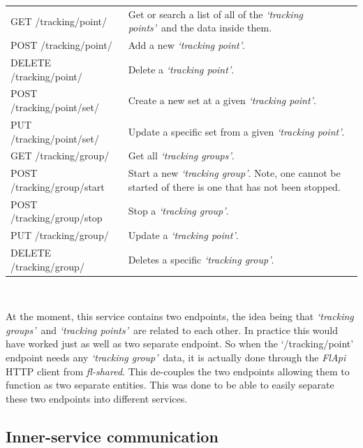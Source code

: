 \documentclass{article}
\newcommand{\vspaceconst}{-2ex}
\newcommand{\tp}{\textit{`tracking point'}}
\newcommand{\tps}{\textit{`tracking points'}}
\newcommand{\tg}{\textit{`tracking group'}}
\newcommand{\tgs}{\textit{`tracking groups'}}
\begin{document}
\begin{multicols}{2}
\begingroup
\centering
\begin{tabular}{p{2.5cm} p{4.5cm}}
  GET /tracking/point/ & Get or search a list of all of the \tps~and the data inside them.\\
  POST /tracking/point/ & Add a new \tp.\\
  DELETE /tracking/point/ & Delete a \tp.\\
  POST /tracking/point/set/ & Create a new set at a given \tp.\\
  PUT /tracking/point/set/ & Update a specific set from a given \tp.\\
  GET /tracking/group/ & Get all \tgs.\\
  POST /tracking/group/start & Start a new \tg. Note, one cannot be started of there is one that has not been stopped.\\
  POST /tracking/group/stop & Stop a \tg.\\
  PUT /tracking/group/ & Update a \tp.\\
  DELETE /tracking/group/ & Deletes a specific \tg.\\
\end{tabular}
~\label{table:flTpEndpoints}
\endgroup

At the moment, this service contains two endpoints, the idea being that \tgs~and \tps~are related to each other. In practice this would have worked just as well as two separate endpoint. So when the `/tracking/point' endpoint needs any \tg~data, it is actually done through the \textit{FlApi} HTTP client from \textit{fl-shared}. This de-couples the two endpoints allowing them to function as two separate entities. This was done to be able to easily separate these two endpoints into different services.\\

\subsection{Inner-service communication}
\vspace{\vspaceconst}
~\label{section:innerServiceComms}


\end{multicols}
\end{document}
